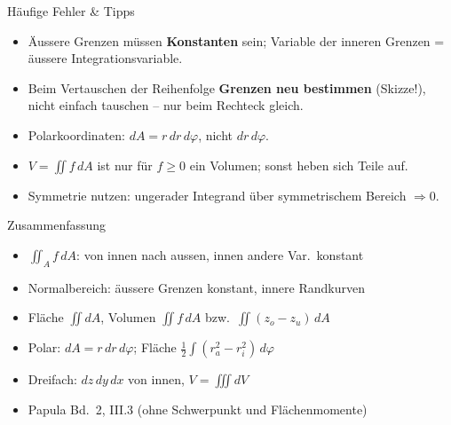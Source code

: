 \documentclass[a4paper, fontsize=7pt]{scrartcl}
\begin{document}
\begin{subbox}{Häufige Fehler \& Tipps}
\begin{itemize}
    \item Äussere Grenzen müssen \textbf{Konstanten} sein; Variable der
          inneren Grenzen = äussere Integrationsvariable.
    \item Beim Vertauschen der Reihenfolge \textbf{Grenzen neu
          bestimmen} (Skizze!), nicht einfach tauschen -- nur beim
          Rechteck gleich.
    \item Polarkoordinaten: \textbf{$dA = r\,dr\,d\varphi$}, nicht
          $dr\,d\varphi$.
    \item $V = \iint f\,dA$ ist nur für $f \ge 0$ ein Volumen; sonst
          heben sich Teile auf.
    \item Symmetrie nutzen: ungerader Integrand über symmetrischem
          Bereich $\Rightarrow 0$.
\end{itemize}
\end{subbox}

\begin{subbox}{Zusammenfassung}
\begin{itemize}
    \item $\iint_A f\, dA$: von innen nach aussen, innen andere Var.\
          konstant
    \item Normalbereich: äussere Grenzen konstant, innere Randkurven
    \item Fläche $\iint dA$, Volumen $\iint f\,dA$ bzw.\
          $\iint (z_o - z_u)\,dA$
    \item Polar: $dA = r\,dr\,d\varphi$; Fläche
          $\frac12 \int (r_a^2 - r_i^2)\, d\varphi$
    \item Dreifach: $dz\,dy\,dx$ von innen, $V = \iiint dV$
    \item Papula Bd.\ 2, III.3 (ohne Schwerpunkt und Flächenmomente)
\end{itemize}
\end{subbox}

%
%
%
\end{document}
